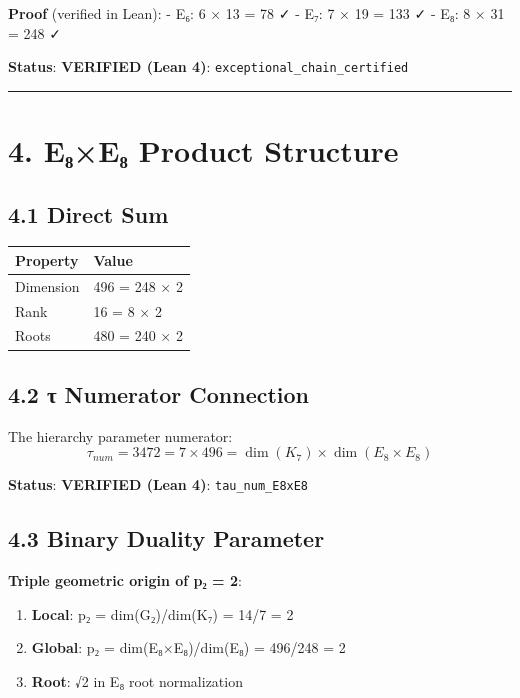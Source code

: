 \documentclass[11pt,a4paper]{article}
\begin{document}
\textbf{Proof} (verified in Lean): - E₆: 6 × 13 = 78 ✓ - E₇: 7 × 19 = 133 ✓ - E₈: 8 × 31 = 248 ✓

\textbf{Status}: \textbf{VERIFIED (Lean 4)}: \texttt{exceptional\_\allowbreak{}chain\_\allowbreak{}certified}

\begin{center}\rule{\linewidth}{0.5pt}\end{center}

\section{4. E₈×E₈ Product Structure}\label{eux2088eux2088-product-structure}

\subsection{4.1 Direct Sum}\label{direct-sum}

\begin{longtable}[]{@{}ll@{}}
\toprule\noalign{}
Property & Value \\
\midrule\noalign{}
\endhead
\bottomrule\noalign{}
\endlastfoot
Dimension & 496 = 248 × 2 \\
Rank & 16 = 8 × 2 \\
Roots & 480 = 240 × 2 \\
\end{longtable}

\subsection{4.2 τ Numerator Connection}\label{ux3c4-numerator-connection}

The hierarchy parameter numerator: \[\tau_{num} = 3472 = 7 \times 496 = \dim(K_7) \times \dim(E_8 \times E_8)\]

\textbf{Status}: \textbf{VERIFIED (Lean 4)}: \texttt{tau\_\allowbreak{}num\_\allowbreak{}E8x\allowbreak{}E8}

\subsection{4.3 Binary Duality Parameter}\label{binary-duality-parameter}

\textbf{Triple geometric origin of p₂ = 2}:

\begin{enumerate}
\def\labelenumi{\arabic{enumi}.}
\tightlist
\item
  \textbf{Local}: p₂ = dim(G₂)/dim(K₇) = 14/7 = 2
\item
  \textbf{Global}: p₂ = dim(E₈×E₈)/dim(E₈) = 496/248 = 2
\item
  \textbf{Root}: √2 in E₈ root normalization
\end{enumerate}
\end{document}
